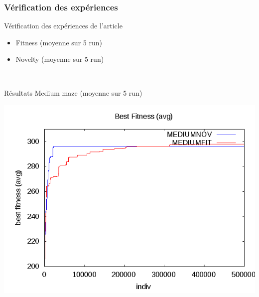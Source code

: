 \documentclass{beamer}
\begin{document}
\begin{frame}
\frametitle{Vérification des expériences}
Vérification des expériences de l'article
\begin{itemize}
    \item Fitness (moyenne sur 5 run)
    \item Novelty (moyenne sur 5 run)
\end{itemize}
\begin{figure}
    \centering
    ~~~
\end{figure}
\end{frame}


\begin{frame}{Résultats}
Medium maze (moyenne sur 5 run)
\begin{center}
    \includegraphics[width=.95\linewidth]{images/medium_bestfitness_means}
\end{center}
\end{frame}
\end{document}
